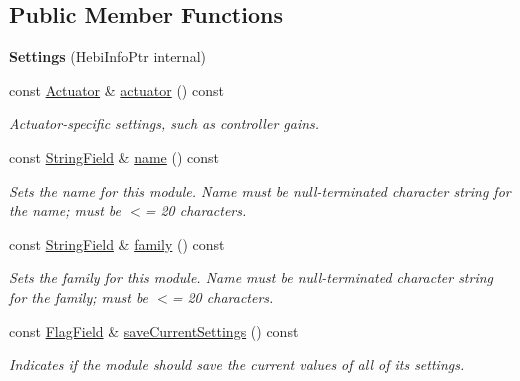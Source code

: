 \subsection*{Public Member Functions}
\begin{DoxyCompactItemize}
\item 
\mbox{\label{classhebi_1_1Info_1_1Settings_ac69626b8a3efd4533b01ab75042471b9}} 
{\bfseries Settings} (Hebi\+Info\+Ptr internal)
\item 
\mbox{\label{classhebi_1_1Info_1_1Settings_a0adc1c7dcd02ddec3789cb77d5911c61}} 
const \hyperlink{classhebi_1_1Info_1_1Settings_1_1Actuator}{Actuator} \& \hyperlink{classhebi_1_1Info_1_1Settings_a0adc1c7dcd02ddec3789cb77d5911c61}{actuator} () const
\begin{DoxyCompactList}\small\item\em Actuator-\/specific settings, such as controller gains. \end{DoxyCompactList}\item 
\mbox{\label{classhebi_1_1Info_1_1Settings_a4bfe9d2443d8cfad6e4934110aa21784}} 
const \hyperlink{classhebi_1_1Info_1_1StringField}{String\+Field} \& \hyperlink{classhebi_1_1Info_1_1Settings_a4bfe9d2443d8cfad6e4934110aa21784}{name} () const
\begin{DoxyCompactList}\small\item\em Sets the name for this module. Name must be null-\/terminated character string for the name; must be $<$= 20 characters. \end{DoxyCompactList}\item 
\mbox{\label{classhebi_1_1Info_1_1Settings_a3425ac565d24627f6ec2fd1f3e4da72b}} 
const \hyperlink{classhebi_1_1Info_1_1StringField}{String\+Field} \& \hyperlink{classhebi_1_1Info_1_1Settings_a3425ac565d24627f6ec2fd1f3e4da72b}{family} () const
\begin{DoxyCompactList}\small\item\em Sets the family for this module. Name must be null-\/terminated character string for the family; must be $<$= 20 characters. \end{DoxyCompactList}\item 
\mbox{\label{classhebi_1_1Info_1_1Settings_a7a1ddd5c02dfcf5b242f541312e4eff3}} 
const \hyperlink{classhebi_1_1Info_1_1FlagField}{Flag\+Field} \& \hyperlink{classhebi_1_1Info_1_1Settings_a7a1ddd5c02dfcf5b242f541312e4eff3}{save\+Current\+Settings} () const
\begin{DoxyCompactList}\small\item\em Indicates if the module should save the current values of all of its settings. \end{DoxyCompactList}\end{DoxyCompactItemize}


